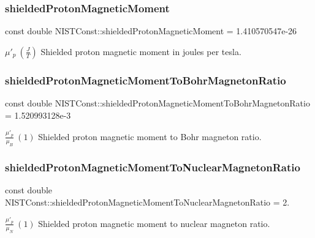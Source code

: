 \subsubsection{\texorpdfstring{shielded\+Proton\+Magnetic\+Moment}{shieldedProtonMagneticMoment}}
{\footnotesize\ttfamily const double N\+I\+S\+T\+Const\+::shielded\+Proton\+Magnetic\+Moment = 1.\+410570547e-\/26}

$\mu'_p \ (\frac{J}{T})$ Shielded proton magnetic moment in joules per tesla. \mbox{\label{group___proton_ga175eb518370bc31471e8ad763e760b72}} 
\subsubsection{\texorpdfstring{shielded\+Proton\+Magnetic\+Moment\+To\+Bohr\+Magneton\+Ratio}{shieldedProtonMagneticMomentToBohrMagnetonRatio}}
{\footnotesize\ttfamily const double N\+I\+S\+T\+Const\+::shielded\+Proton\+Magnetic\+Moment\+To\+Bohr\+Magneton\+Ratio = 1.\+520993128e-\/3}

$\frac{\mu'_p}{\mu_B} \ (1)$ Shielded proton magnetic moment to Bohr magneton ratio. \mbox{\label{group___proton_ga03e84ef0d1452fa7c647f8866913fbc3}} 
\subsubsection{\texorpdfstring{shielded\+Proton\+Magnetic\+Moment\+To\+Nuclear\+Magneton\+Ratio}{shieldedProtonMagneticMomentToNuclearMagnetonRatio}}
{\footnotesize\ttfamily const double N\+I\+S\+T\+Const\+::shielded\+Proton\+Magnetic\+Moment\+To\+Nuclear\+Magneton\+Ratio = 2.}

$\frac{\mu'_p}{\mu_N} \ (1)$ Shielded proton magnetic moment to nuclear magneton ratio. 